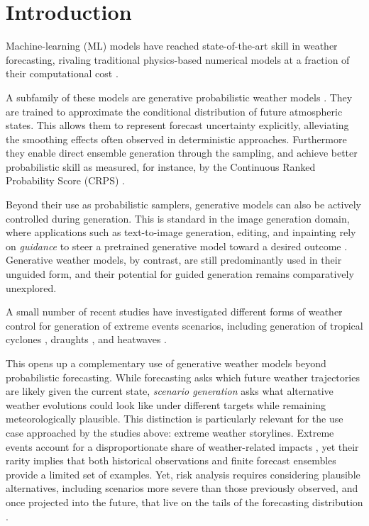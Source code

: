 
\chapter{Introduction}
\label{ch:intro}

Machine-learning (ML) models have reached state-of-the-art skill in weather
forecasting, rivaling traditional physics-based numerical models at a fraction
of their computational cost
\parencite{lam2023graphcast,bi2023pangu}.

A subfamily of these models are generative probabilistic weather models \parencite{price2023gencast,couairon2024archesweather}.
They are trained to approximate the conditional distribution of future atmospheric states.
This allows them to represent forecast uncertainty explicitly, alleviating the
smoothing effects often observed in deterministic approaches. Furthermore they enable
direct ensemble generation through the sampling, and achieve better probabilistic skill as
measured, for instance, by the Continuous Ranked Probability Score (CRPS)
\parencite{hersbach2000crps,price2023gencast}.

Beyond their use as probabilistic samplers, 
generative models can also be actively controlled during generation.
This is standard in the image generation domain, where applications such as text-to-image generation, editing,
and inpainting rely on \emph{guidance} to steer a pretrained
generative model toward a desired outcome
\parencite{dhariwal2021diffusion,ho2022classifierfree,nichol2021glide}.
Generative weather models, by contrast, are still predominantly used in their
unguided form, and their potential for guided generation remains
comparatively unexplored.

A small number of recent studies have investigated different forms of
weather control for generation of extreme events scenarios, including generation of tropical cyclones \parencite{brenowitz2025climate},
draughts
\parencite{ueyama2026guided}, and heatwaves
\parencite{whittaker2025heatwaves}.

This opens up a complementary use of generative weather models beyond
probabilistic forecasting.
While forecasting asks which future weather trajectories are likely given the
current state, \emph{scenario generation} asks what alternative weather
evolutions could look like under different targets while remaining meteorologically plausible.
This distinction is particularly relevant for the use case approached by the studies above: extreme weather storylines.
Extreme events account for a disproportionate share of weather-related impacts
\parencite{wmo2023atlas}, yet their rarity implies that both historical
observations and finite forecast ensembles provide a limited set of examples.
Yet, risk analysis requires considering plausible alternatives, 
including scenarios more severe than those previously observed, and once projected into the future, that live on the tails of the forecasting distribution
\parencite{thompson2017unseen,shepherd2018storylines}.

